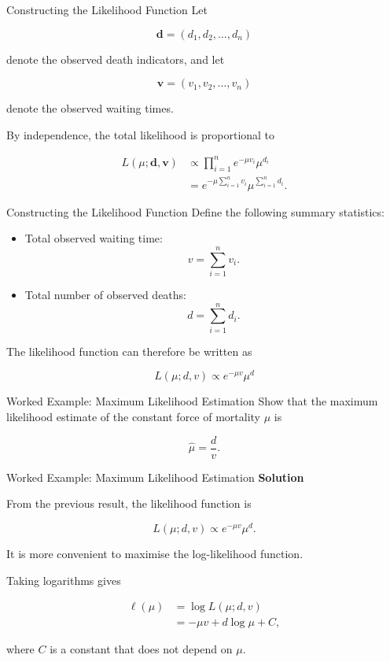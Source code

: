 \documentclass[
  ignorenonframetext,
  aspectratio=169,
]{beamer}
\begin{document}
\begin{frame}{Constructing the Likelihood Function}
\protect{}\label{constructing-the-likelihood-function}
Let

\[
\mathbf{d}=(d_1,d_2,\ldots,d_n)
\]

denote the observed death indicators, and let

\[
\mathbf{v}=(v_1,v_2,\ldots,v_n)
\]

denote the observed waiting times.

By independence, the total likelihood is proportional to

\[
\begin{aligned}
L(\mu;\mathbf{d},\mathbf{v})
&\propto \prod_{i=1}^{n}e^{-\mu v_i}\mu^{d_i}\\
&=e^{-\mu\sum_{i=1}^{n}v_i}
  \mu^{\sum_{i=1}^{n}d_i}.
\end{aligned}
\]
\end{frame}

\begin{frame}{Constructing the Likelihood Function}
\protect{}\label{constructing-the-likelihood-function-1}
Define the following summary statistics:

\begin{itemize}
\item
  Total observed waiting time: \[
  v=\sum_{i=1}^{n}v_i.
  \]
\item
  Total number of observed deaths: \[
  d=\sum_{i=1}^{n}d_i.
  \]
\end{itemize}

The likelihood function can therefore be written as

\[
\boxed{
L(\mu;d,v)\propto e^{-\mu v}\mu^d
}
\]
\end{frame}

\begin{frame}{Worked Example: Maximum Likelihood Estimation}
\protect{}\label{worked-example-maximum-likelihood-estimation}
Show that the maximum likelihood estimate of the constant force of
mortality \(\mu\) is

\[
\boxed{\hat{\mu}=\frac{d}{v}}.
\]
\end{frame}

\begin{frame}{Worked Example: Maximum Likelihood Estimation}
\protect{}\label{worked-example-maximum-likelihood-estimation-1}
\textbf{Solution}

From the previous result, the likelihood function is

\[
L(\mu;d,v)\propto e^{-\mu v}\mu^d.
\]

It is more convenient to maximise the log-likelihood function.

Taking logarithms gives

\[
\begin{aligned}
\ell(\mu)
&=\log L(\mu;d,v)\\
&=-\mu v+d\log\mu+C,
\end{aligned}
\]

where \(C\) is a constant that does not depend on \(\mu\).
\end{frame}
\end{document}
